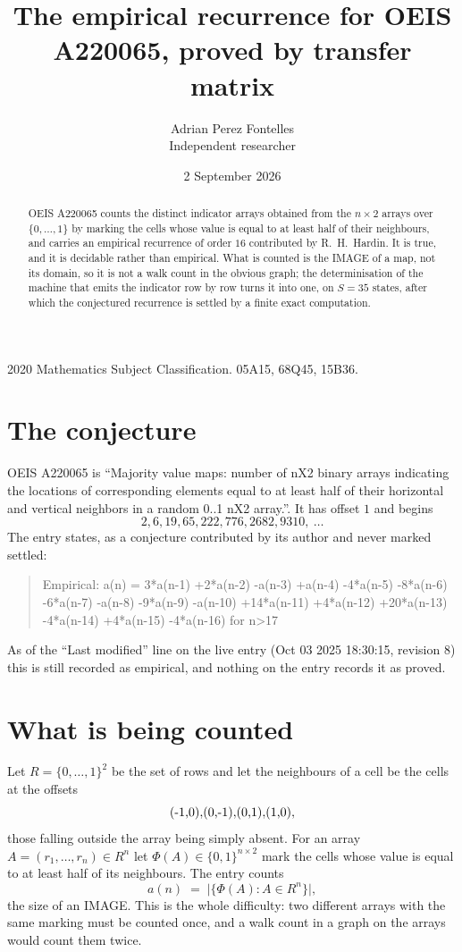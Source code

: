 \documentclass[11pt,a4paper]{article}
\title{The empirical recurrence for OEIS A220065, proved by transfer matrix}
\author{Adrian Perez Fontelles\\ \small Independent researcher}
\date{2 September 2026}
\theoremstyle{plain}
\theoremstyle{definition}
\begin{document}
\maketitle

\begin{abstract}
OEIS A220065 counts the distinct indicator arrays obtained from the $n\times2$ arrays over
$\{0,\dots,1\}$ by marking the cells whose value is equal to at least half of their neighbours, and carries an
empirical recurrence of order $16$ contributed by R.~H.~Hardin. It is true, and it is
decidable rather than empirical. What is counted is the IMAGE of a map, not its domain, so it
is not a walk count in the obvious graph; the determinisation of the machine that emits the
indicator row by row turns it into one, on $S=35$ states, after which the conjectured
recurrence is settled by a finite exact computation.
\end{abstract}

\noindent\small 2020 Mathematics Subject Classification. 05A15, 68Q45, 15B36.\normalsize

\section{The conjecture}

OEIS A220065 is ``Majority value maps: number of nX2 binary arrays indicating the locations of corresponding elements equal to at least half of their horizontal and vertical neighbors in a random 0..1 nX2 array.''. It has offset $1$ and begins
\[
2, 6, 19, 65, 222, 776, 2682, 9310,\ \dots
\]
The entry states, as a conjecture contributed by its author and never marked settled:
\begin{quote}
Empirical: a(n) = 3*a(n-1) +2*a(n-2) -a(n-3) +a(n-4) -4*a(n-5) -8*a(n-6) -6*a(n-7) -a(n-8) -9*a(n-9) -a(n-10) +14*a(n-11) +4*a(n-12) +20*a(n-13) -4*a(n-14) +4*a(n-15) -4*a(n-16) for n>17
\end{quote}
As of the ``Last modified'' line on the live entry (Oct 03 2025 18:30:15, revision 8) this is still
recorded as empirical, and nothing on the entry records it as proved.

\section{What is being counted}

Let $R=\{0,\dots,1\}^{2}$ be the set of rows and let the neighbours of a cell be the
cells at the offsets
\[
$(-1,0)$, $(0,-1)$, $(0,1)$, $(1,0)$,
\]
those falling outside the array being simply absent. For an array
$A=(r_1,\dots,r_n)\in R^n$ let $\Phi(A)\in\{0,1\}^{n\times2}$ mark the cells whose value
is equal to at least half of its neighbours. The entry counts
\[
a(n)\;=\;\bigl|\{\Phi(A):A\in R^n\}\bigr| ,
\]
the size of an IMAGE. This is the whole difficulty: two different arrays with the same marking
must be counted once, and a walk count in a graph on the arrays would count them twice.
\end{document}
